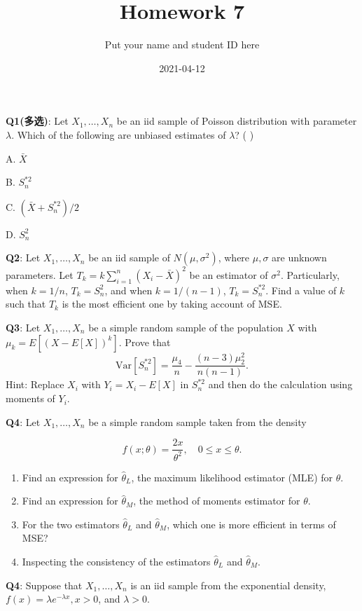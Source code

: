 \documentclass[]{article}
\title{Homework 7}
\author{Put your name and student ID here}
\date{2021-04-12}
\begin{document}
\maketitle

\textbf{Q1(多选)}: Let \(X_1,\dots,X_n\) be an iid sample of Poisson
distribution with parameter \(\lambda\). Which of the following are
unbiased estimates of \(\lambda\)? ( )

A. \(\bar X\)

B. \(S_n^{*2}\)

C. \((\bar X+S_n^{*2})/2\)

D. \(S_n^2\)

\textbf{Q2}: Let \(X_1,\dots,X_n\) be an iid sample of
\(N(\mu,\sigma^2)\), where \(\mu,\sigma\) are unknown parameters. Let
\(T_k=k\sum_{i=1}^n(X_i-\bar X)^2\) be an estimator of \(\sigma^2\).
Particularly, when \(k=1/n\), \(T_k=S_n^2\), and when \(k=1/(n-1)\),
\(T_k=S_n^{*2}\). Find a value of \(k\) such that \(T_k\) is the most
efficient one by taking account of MSE.

\textbf{Q3}: Let \(X_1,\dots,X_n\) be a simple random sample of the
population \(X\) with \(\mu_k = E[(X-E[X])^k]\). Prove that
\[\mathrm{Var}[S_n^{*2}]= \frac{\mu_4}{n}-\frac{(n-3)\mu_2^2}{n(n-1)}.\]
Hint: Replace \(X_i\) with \(Y_i=X_i-E[X]\) in \(S_n^{*2}\) and then do
the calculation using moments of \(Y_i\).

\textbf{Q4}: Let \(X_1,\dots,X_n\) be a simple random sample taken from
the density

\[f(x;\theta)=\frac{2x}{\theta^2},\quad 0\le x\le \theta.\]

\begin{enumerate}
\def\labelenumi{\arabic{enumi}.}
\item
  Find an expression for \(\hat\theta_L\), the maximum likelihood
  estimator (MLE) for \(\theta\).
\item
  Find an expression for \(\hat\theta_M\), the method of moments
  estimator for \(\theta\).
\item
  For the two estimators \(\hat\theta_L\) and \(\hat\theta_M\), which
  one is more efficient in terms of MSE?
\item
  Inspecting the consistency of the estimators \(\hat\theta_L\) and
  \(\hat\theta_M\).
\end{enumerate}

\textbf{Q4}: Suppose that \(X_1,\dots,X_n\) is an iid sample from the
exponential density, \(f(x)=\lambda e^{-\lambda x},x>0\), and
\(\lambda>0\).
\end{document}
